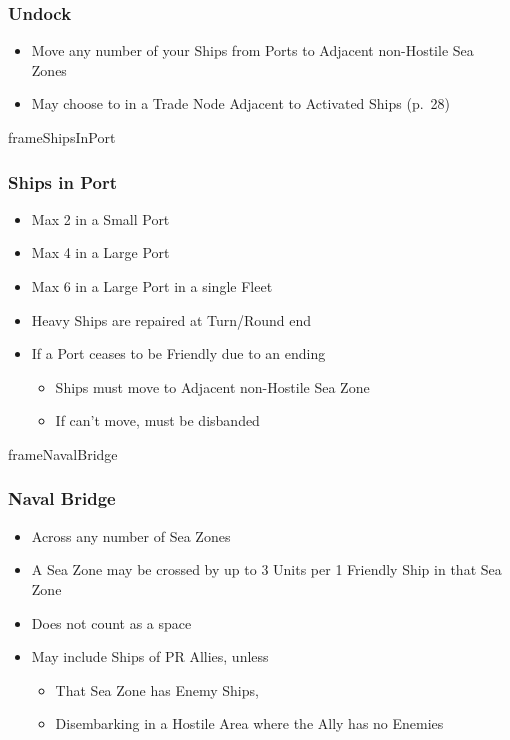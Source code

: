 \documentclass[10pt]{article}
\newlength{\fhNavalBridge} \setlength\fhNavalBridge{9\baselineskip}
\newlength{\fhShipsInPort} \setlength\fhShipsInPort{11\baselineskip}
\begin{document}
\subsubsection*{Undock}
\begin{itemize}
	\item Move any number of your Ships from Ports to Adjacent non-Hostile Sea Zones
	\item May choose to  in a Trade Node Adjacent to Activated Ships (p.~28)
\end{itemize}

\begin{dynamiccontents*}{frameShipsInPort}\begin{eubox}{\fhShipsInPort}
	\subsubsection*{Ships in Port }
	\begin{itemize}
		\item Max 2 in a Small Port
		\item Max 4 in a Large Port
		\item Max 6 in a Large Port in a single Fleet
		\item Heavy Ships are repaired at Turn/Round end
		\item If a Port ceases to be Friendly due to an ending \alliance
		\begin{itemize}
			\item Ships must move to Adjacent non-Hostile Sea Zone
			\item If can't move, must be disbanded 
		\end{itemize}
	\end{itemize}
\end{eubox}\end{dynamiccontents*}

\begin{dynamiccontents*}{frameNavalBridge}\begin{eubox}{\fhNavalBridge}
	\subsubsection*{Naval Bridge }
	\begin{itemize}
		\item Across any number of Sea Zones
		\item A Sea Zone may be crossed by up to 3 Units per 1 Friendly Ship in that Sea Zone
		\item Does not count as a space
		\item May include Ships of PR Allies, unless
		\begin{itemize}
			\item That Sea Zone has Enemy Ships, 
			\item Disembarking in a Hostile Area where the Ally has no Enemies
		\end{itemize}
	\end{itemize}
\end{eubox}\end{dynamiccontents*}
\end{document}
